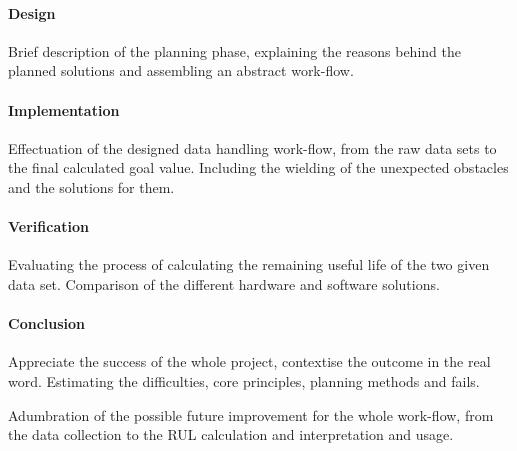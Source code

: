 		\paragraph{Design}

Brief description of the planning phase, explaining the reasons behind the planned solutions and assembling an abstract work-flow.

		\paragraph{Implementation}

Effectuation of the designed data handling work-flow, from the raw data sets to the final calculated goal value. Including the wielding of the unexpected obstacles and the solutions for them.

		\paragraph{Verification}

Evaluating the process of calculating the remaining useful life of the two given data set. Comparison of the different hardware and software solutions.

		\paragraph{Conclusion}

Appreciate the success of the whole project, contextise the outcome in the real word. Estimating the difficulties, core principles, planning methods and fails.

Adumbration of the possible future improvement for the whole work-flow, from the data collection to the RUL calculation and interpretation and usage.

